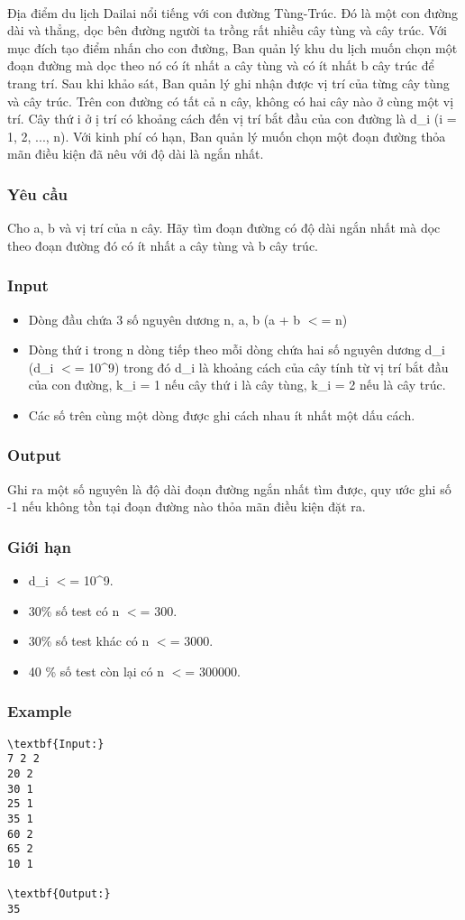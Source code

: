 

 

Địa điểm du lịch Dailai nổi tiếng với con đường Tùng-Trúc. Đó là một con đường dài và thẳng, dọc bên đường người ta trồng rất nhiều cây tùng và cây trúc. Với mục đích tạo điểm nhấn cho con đường, Ban quản lý khu du lịch muốn chọn một đoạn đường mà dọc theo nó có ít nhất a cây tùng và có ít nhất b cây trúc để trang trí. Sau khi khảo sát, Ban quản lý ghi nhận được vị trí của từng cây tùng và cây trúc. Trên con đường có tất cả n cây, không có hai cây nào ở cùng một vị trí. Cây thứ i ở ị trí có khoảng cách đến vị trí bắt đầu của con đường là d\_i (i = 1, 2, ..., n). Với kinh phí có hạn, Ban quản lý muốn chọn một đoạn đường thỏa mãn điều kiện đã nêu với độ dài là ngắn nhất.

\subsubsection{Yêu cầu}

Cho a, b và vị trí của n cây. Hãy tìm đoạn đường có độ dài ngắn nhất mà dọc theo đoạn đường đó có ít nhất a cây tùng và b cây trúc.

\subsubsection{Input}
\begin{itemize}
	\item Dòng đầu chứa 3 số nguyên dương n, a, b (a + b $<$= n)
	\item Dòng thứ i trong n dòng tiếp theo mỗi dòng chứa hai số nguyên dương d\_i (d\_i $<$= 10\textasciicircum9) trong đó d\_i là khoảng cách của cây tính từ vị trí bắt đầu của con đường, k\_i = 1 nếu cây thứ i là cây tùng, k\_i = 2 nếu là cây trúc.
	\item Các số trên cùng một dòng được ghi cách nhau ít nhất một dấu cách.
\end{itemize}

\subsubsection{Output}

Ghi ra một số nguyên là độ dài đoạn đường ngắn nhất tìm được, quy ước ghi số -1 nếu không tồn tại đoạn đường nào thỏa mãn điều kiện đặt ra.

\subsubsection{Giới hạn}
\begin{itemize}
	\item d\_i $<$= 10\textasciicircum9.
	\item 30\% số test có n $<$= 300.
	\item 30\% số test khác có n $<$= 3000.
	\item 40 \% số test còn lại có n $<$= 300000.
\end{itemize}

\subsubsection{Example}
\begin{verbatim}
\textbf{Input:}
7 2 2
20 2
30 1
25 1
35 1
60 2
65 2
10 1

\textbf{Output:}
35\end{verbatim}